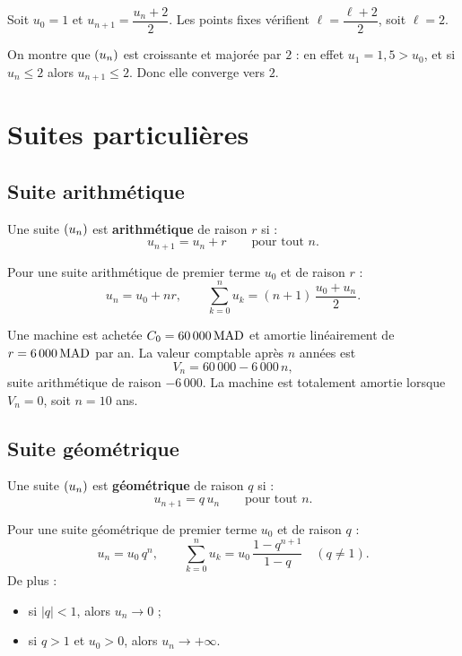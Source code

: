 \documentclass[12pt,a4paper]{article}
\begin{document}
\begin{exemplebox}[9.1]
Soit $u_0 = 1$ et $u_{n+1} = \dfrac{u_n+2}{2}$. Les points fixes vérifient $\ell = \dfrac{\ell+2}{2}$, soit $\ell=2$.

On montre que $(u_n)$ est croissante et majorée par $2$ : en effet $u_1 = 1{,}5 > u_0$, et si $u_n \leq 2$ alors $u_{n+1} \leq 2$. Donc elle converge vers $2$.
\end{exemplebox}

\section{Suites particulières}

\subsection{Suite arithmétique}

\begin{definitionbox}[10.1]
Une suite $(u_n)$ est \textbf{arithmétique} de raison $r$ si :
\[
u_{n+1} = u_n + r \qquad \text{pour tout } n.
\]
\end{definitionbox}

\begin{propbox}[10.1]
Pour une suite arithmétique de premier terme $u_0$ et de raison $r$ :
\[
u_n = u_0 + n r,
\qquad
\sum_{k=0}^{n} u_k = (n+1)\,\dfrac{u_0 + u_n}{2}.
\]
\end{propbox}

\begin{gestionbox}
Une machine est achetée $C_0 = 60\,000\,\mathrm{MAD}$ et amortie linéairement de $r = 6\,000\,\mathrm{MAD}$ par an. La valeur comptable après $n$ années est
\[
V_n = 60\,000 - 6\,000\, n,
\]
suite arithmétique de raison $-6\,000$. La machine est totalement amortie lorsque $V_n = 0$, soit $n = 10$ ans.
\end{gestionbox}

\subsection{Suite géométrique}

\begin{definitionbox}[10.2]
Une suite $(u_n)$ est \textbf{géométrique} de raison $q$ si :
\[
u_{n+1} = q\, u_n \qquad \text{pour tout } n.
\]
\end{definitionbox}

\begin{propbox}[10.2]
Pour une suite géométrique de premier terme $u_0$ et de raison $q$ :
\[
u_n = u_0\, q^n,
\qquad
\sum_{k=0}^{n} u_k = u_0\,\dfrac{1-q^{n+1}}{1-q}\quad (q\neq 1).
\]
De plus :
\begin{itemize}
  \item si $\lvert q\rvert < 1$, alors $u_n \to 0$ ;
  \item si $q>1$ et $u_0>0$, alors $u_n \to +\infty$.
\end{itemize}
\end{propbox}
\end{document}
